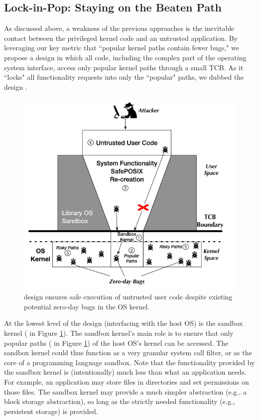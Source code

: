 \subsection{Lock-in-Pop: Staying on the Beaten Path}

As discussed above, a weakness of the previous approaches is the inevitable contact
between the privileged kernel code and an untrusted application.
By leveraging our key metric
that ``popular kernel paths contain fewer bugs," we propose a design
in which all code, including the complex part
of the operating system interface, access only
popular kernel paths through a small TCB. As it ``locks" all functionality
requests into only the ``popular" paths, we dubbed the
design \lip.

\begin{figure}%
\centering
\includegraphics[width=1.0\columnwidth]{diagram/Virtualization_Design_Model_01.png}
\caption{\small \lip design ensures safe execution of untrusted user code
despite existing potential zero-day bugs in the OS kernel.}
\label{fig:design_safe_reimplementation}
\end{figure}

At the lowest level of the design (interfacing with the host OS) is the
sandbox kernel ( in Figure \ref{fig:design_safe_reimplementation}).
The sandbox kernel's main role is to ensure that only popular paths ( in Figure \ref{fig:design_safe_reimplementation})
of the host OS's kernel can be accessed.
The sandbox kernel could thus function as a very granular system call filter, or
as the core of a programming language sandbox. Note that the functionality
provided by the sandbox kernel is (intentionally) much less than what
an application needs. For example, an application may store files in directories and set permissions on those files.
The sandbox kernel may provide a much simpler abstraction (e.g., a block storage abstraction),
so long as the strictly needed functionality (e.g., persistent storage) is provided.


